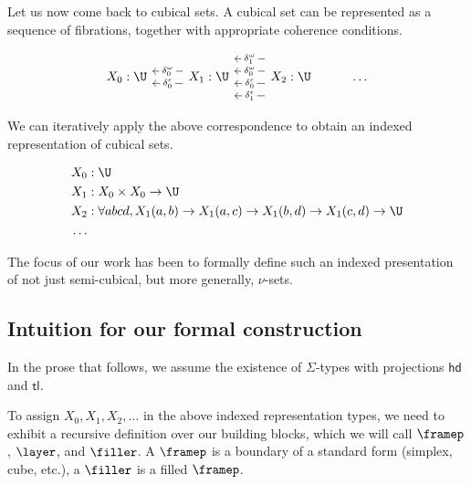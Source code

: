 \documentclass[10pt]{art.cls/art}
\newcommand{\tl}{\ensuremath{\mathsf{tl}}}
\newcommand{\hd}{\ensuremath{\mathsf{hd}}}
\begin{document}
Let us now come back to cubical sets. A cubical set can be represented as a sequence of fibrations, together with appropriate coherence conditions.

\begin{equation*}
  \begin{tikzcd}
    X_0 : \U & X_1 : \U \arrow[l, "\delta^\epsilon_0" description, shift left=2] \arrow[l, "\delta^\omega_0" description, shift right=2] & X_2 : \U \arrow[l, "\delta^\epsilon_1" description, shift left=6] \arrow[l, "\delta^\epsilon_0" description, shift left=2] \arrow[l, "\delta^\omega_0" description, shift right=2] \arrow[l, "\delta^\omega_1" description, shift right=6] & \ldots
  \end{tikzcd}
\end{equation*}

We can iteratively apply the above correspondence to obtain an indexed representation of cubical sets.

\begin{align*}
  X_0 & : \U                                                                                                              \\
  X_1 & : X_0 \times X_0 \rightarrow \U                                                                                   \\
  X_2 & : \forall a b c d, X_1 (a, b) \rightarrow X_1 (a, c) \rightarrow X_1 (b, d) \rightarrow X_1 (c, d) \rightarrow \U \\
  \ldots
\end{align*}

The focus of our work has been to formally define such an indexed presentation of not just semi-cubical, but more generally, $\nu$-sets.

\subsection{Intuition for our formal construction}
\begin{notation}[\Sigma]
  In the prose that follows, we assume the existence of $\Sigma$-types with projections $\hd$ and $\tl$.
\end{notation}

To assign $X_0, X_1, X_2, \ldots$ in the above indexed representation types, we need to exhibit a recursive definition over our building blocks, which we will call $\framep$, $\layer$, and $\filler$. A $\framep$ is a boundary of a standard form (simplex, cube, etc.), a $\filler$ is a filled $\framep$.
\end{document}
